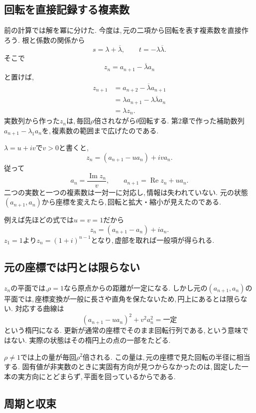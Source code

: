 \subsection{回転を直接記録する複素数}\label{節：複素数の状態}

前の計算では解を冪に分けた.
今度は,\,元の二項から回転を表す複素数を直接作ろう.
根と係数の関係から
\[
 s=\lambda+\overline\lambda,\qquad
 t=-\lambda\overline\lambda.
\]
そこで
\[
 z_n=a_{n+1}-\overline\lambda a_n
\]
と置けば,
\[
 \begin{aligned}
 z_{n+1}
 &=a_{n+2}-\overline\lambda a_{n+1}\\
 &=\lambda a_{n+1}-\lambda\overline\lambda a_n\\
 &=\lambda z_n.
 \end{aligned}
\]
実数列から作った$z_n$は,\,毎回$\rho$倍されながら$\theta$回転する.
第2章で作った補助数列$a_{n+1}-\lambda_1a_n$を,\,複素数の範囲まで広げたのである.

$\lambda=u+iv$で$v>0$と書くと,
\[
 z_n=(a_{n+1}-ua_n)+iv a_n.
\]
従って
\[
 a_n=\frac{\operatorname{Im}z_n}{v},\qquad
 a_{n+1}=\operatorname{Re}z_n+u a_n.
\]
二つの実数と一つの複素数は一対一に対応し,\,情報は失われていない.
元の状態$(a_{n+1},a_n)$から座標を変えたら,\,回転と拡大・縮小が見えたのである.

例えば先ほどの式では$u=v=1$だから
\[
 z_n=(a_{n+1}-a_n)+ia_n.
\]
$z_1=1$より$z_n=(1+i)^{n-1}$となり,\,虚部を取れば一般項が得られる.
\NewFigSpiral

\subsection{元の座標では円とは限らない}

$z_n$の平面では,$\rho=1$なら原点からの距離が一定になる.
しかし元の$(a_{n+1},a_n)$の平面では,\,座標変換が一般に長さや直角を保たないため,\,円上にあるとは限らない.
対応する曲線は
\[
 (a_{n+1}-ua_n)^2+v^2a_n^2=\text{一定}
\]
という楕円になる.
更新が通常の座標でそのまま回転行列である,\,という意味ではない.
実際の状態はその楕円上の点の一部をたどる.

$\rho\ne1$では上の量が毎回$\rho^2$倍される.
この量は,\,元の座標で見た回転の半径に相当する.
固有値が非実数のときに実固有方向が見つからなかったのは,\,固定した一本の実方向にとどまらず,\,平面を回っているからである.

\subsection{周期と収束}

